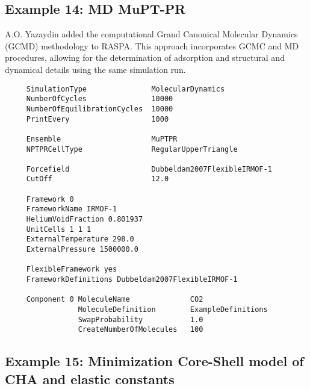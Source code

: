 \subsection*{Example 14: MD MuPT-PR}

A.O. Yazaydin added the computational Grand Canonical Molecular Dynamics (GCMD) methodology to RASPA\cite{Loganathan2017,Loganathan2018}.
This approach incorporates GCMC and MD procedures, allowing for the determination of adsorption and structural and
dynamical details using the same simulation run.
\begin{tiny}
\begin{verbatim}
     SimulationType               MolecularDynamics
     NumberOfCycles               10000
     NumberOfEquilibrationCycles  10000
     PrintEvery                   1000

     Ensemble                     MuPTPR
     NPTPRCellType                RegularUpperTriangle

     Forcefield                   Dubbeldam2007FlexibleIRMOF-1
     CutOff                       12.0

     Framework 0
     FrameworkName IRMOF-1
     HeliumVoidFraction 0.801937
     UnitCells 1 1 1
     ExternalTemperature 298.0
     ExternalPressure 1500000.0

     FlexibleFramework yes
     FrameworkDefinitions Dubbeldam2007FlexibleIRMOF-1

     Component 0 MoleculeName              CO2
                 MoleculeDefinition        ExampleDefinitions
                 SwapProbability           1.0
                 CreateNumberOfMolecules   100
\end{verbatim}
\end{tiny}

\subsection*{Example 15: Minimization Core-Shell model of CHA and elastic constants}

